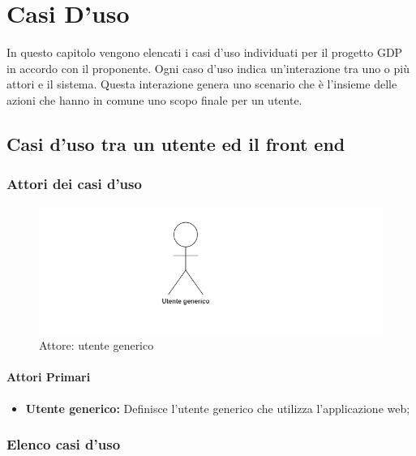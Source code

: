 \chapter{Casi D'uso}\label{casiDuso}
In questo capitolo vengono elencati i casi d'uso individuati per il progetto GDP in accordo con il proponente. Ogni caso d'uso indica un'interazione tra uno o più attori e il sistema. Questa interazione genera uno scenario che è l'insieme delle azioni che hanno in comune uno scopo finale per un utente.

\section{Casi d'uso tra un utente ed il front end}
\subsection{Attori dei casi d'uso}
\begin{center}
	\begin{figure}[H]
		\includegraphics{../immagini/attori_casi/utente_generico.png}
		\caption{Attore: utente generico}
	\end{figure}
\end{center}
\subsubsection{Attori Primari}\label{UFattoriPrimari}
\begin{itemize}
	\item \textbf{Utente generico:} Definisce l'utente generico che utilizza l'applicazione web;
\end{itemize}

\subsection{Elenco casi d'uso}\label{UFelencoCasiDuso}

